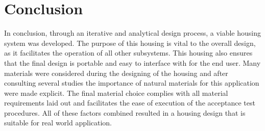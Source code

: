 \documentclass[class=report,11pt,crop=false]{standalone}
\begin{document}
\section{Conclusion}
In conclusion, through an iterative and analytical design process, a viable housing system was developed. The purpose of this housing is vital to the overall design, as it facilitates the operation of all other subsystems. This housing also ensures that the final design is portable and easy to interface with for the end user. Many materials were considered during the designing of the housing and after consulting several studies the importance of natural materials for this application were made explicit. The final material choice complies with all material requirements laid out and facilitates the ease of execution of the acceptance test procedures. All of these factors combined resulted in a housing design that is suitable for real world application. 
	\ifstandalone
	
	\printnoidxglossary[type=\acronymtype,nonumberlist]
	\fi
	
\end{document}

